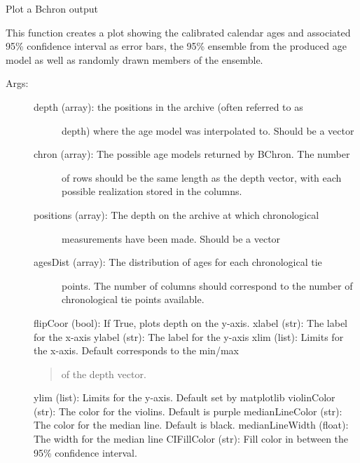 \documentclass[letterpaper,10pt,english]{sphinxmanual}
\begin{document}
\begin{fulllineitems}
\label{\detokenize{RBchron:pyleoclim.RBchron.plotBchron}}
Plot a Bchron output

This function creates a plot showing the calibrated calendar ages and
associated 95\% confidence interval as error bars, the 95\% ensemble from
the produced age model as well as randomly drawn members of the ensemble.
\begin{description}
\item[{Args:}] \leavevmode\begin{description}
\item[{depth (array): the positions in the archive (often referred to as}] \leavevmode
depth) where the age model was interpolated to. Should be a vector

\item[{chron (array): The possible age models returned by BChron. The number}] \leavevmode
of rows should be the same length as the depth vector, with each
possible realization stored in the columns.

\item[{positions (array): The depth on the archive at which chronological}] \leavevmode
measurements have been made. Should be a vector

\item[{agesDist (array): The distribution of ages for each chronological tie}] \leavevmode
points. The number of columns should correspond to the number of
chronological tie points available.

\end{description}

flipCoor (bool): If True, plots depth on the y-axis.     
xlabel (str): The label for the x-axis
ylabel (str): The label for the y-axis
xlim (list): Limits for the x-axis. Default corresponds to the min/max
\begin{quote}

of the depth vector.
\end{quote}

ylim (list): Limits for the y-axis. Default set by matplotlib
violinColor (str): The color for the violins. Default is purple
medianLineColor (str): The color for the median line. Default is black.
medianLineWidth (float): The width for the median line
CIFillColor (str): Fill color in between the 95\% confidence interval.
\begin{quote}


\end{quote}
\end{description}
\end{fulllineitems}
\end{document}
